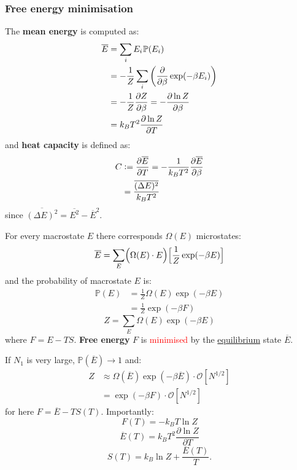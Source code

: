 \documentclass{article}
\newcommand{\deq}{\vcentcolon=}
\begin{document}
\begin{multicols*}{3}
\subsubsection*{Free energy minimisation}
The \textbf{mean energy} is computed as:
\begin{align*}
    \overline{E}
    &=\sum_i E_i\hspace{0.01in}\mathbb{P}(E_i) \\
    &=-\frac{1}{Z}\sum_i\left(\frac{\partial}{\partial\beta}
    \exp(-\beta E_i)\right) \\
    &=-\frac{1}{Z}\frac{\partial Z}{\partial\beta}
    =-\frac{\partial\ln Z}{\partial\beta} \\
    &=k_B T^2\frac{\partial\ln Z}{\partial T}
\end{align*}
and \textbf{heat capacity} is defined as:
\begin{align*}
    C
    &\deq\frac{\partial\overline{E}}{\partial T}
    =-\frac{1}{k_B T^2}
    \frac{\partial\overline{E}}{\partial\beta} \\
    &=\frac{\overline{(\Delta E)^2}}{k_B T^2}
\end{align*}
since $\overline{(\Delta E)^2}=\overline{E^2}
-\overline{E}^2$.

\newcolumn

For every macrostate $E$ 
there corresponds $\Omega(E)$ microstates:
$$\overline{E}=\sum_{E}\Bigl(\Omega(E)\cdot E\Bigr)
\Bigl[\frac{1}{Z}\exp(-\beta E)\Bigr]$$
and the probability of macrostate $E$ is:
\begin{align*}
    \mathbb{P}(E)
    &=\frac{1}{Z}\Omega(E)\exp(-\beta E) \\
    &=\frac{1}{Z}\exp(-\beta F)
\end{align*}
$$Z=\sum_E\Omega(E)\exp(-\beta E)$$
where $F=E-TS$. \textbf{Free energy} $F$ is
\textcolor{red}{minimised} by the
\underline{equilibrium} state $\overline{E}$.

If $N_1$ is very large, $\mathbb{P}(\overline{E})\rightarrow1$ and:
\begin{align*}
    Z
    &\approx\Omega(\overline{E})\exp(-\beta\overline{E})
    \cdot\mathcal{O}[N^{1/2}] \\
    &=\exp(-\beta F)\cdot\mathcal{O}[N^{1/2}]
\end{align*}
for here $F=\overline{E}-T S(T)$. Importantly:
$$F(T)=-k_B T\ln Z$$
$$\overline{E}(T)=k_B T^2\frac{\partial\ln Z}{\partial T}$$
$$S(T)=k_B\ln Z+\frac{\overline{E}(T)}{T}.$$


\end{multicols*}
\end{document}
